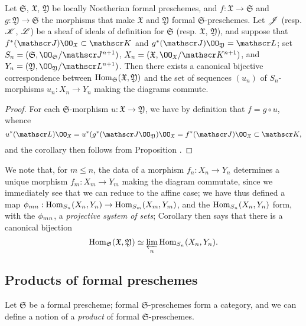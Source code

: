 \begin{cor}[10.6.11]
\label{1.10.6.11}
Let $\mathfrak{S}$, $\mathfrak{X}$, $\mathfrak{Y}$ be locally Noetherian formal preschemes, and $f:\mathfrak{X}\to\mathfrak{S}$ and $g:\mathfrak{Y}\to\mathfrak{S}$ the morphisms that make $\mathfrak{X}$ and $\mathfrak{Y}$ formal $\mathfrak{S}$-preschemes.
Let $\mathscr{J}$ (resp. $\mathscr{K}$, $\mathscr{L}$) be a sheaf of ideals of definition for $\mathfrak{S}$ (resp. $\mathfrak{X}$, $\mathfrak{Y}$), and suppose that $f^*(\sh{J})\OO_\mathfrak{X}\subset\sh{K}$ and $g^*(\sh{J})\OO_\mathfrak{Y}=\sh{L}$; set $S_n=(\mathfrak{S},\OO_\mathfrak{S}/\sh{J}^{n+1})$, $X_n=(\mathfrak{X},\OO_\mathfrak{X}/\sh{K}^{n+1})$, and $Y_n=(\mathfrak{Y},\OO_\mathfrak{Y}/\sh{L}^{n+1})$.
Then there exists a canonical bijective correspondence
between $\operatorname{Hom}_\mathfrak{S}(\mathfrak{X},\mathfrak{Y})$ and the set of sequences $(u_n)$ of $S_n$-morphisms $u_n:X_n\to Y_n$ making the diagrams  commute.
\end{cor}

\begin{proof}
\label{proof-1.10.6.11}
For each $\mathfrak{S}$-morphism $u:\mathfrak{X}\to\mathfrak{Y}$, we have by definition that $f=g\circ u$, whence
\[
  u^*(\sh{L})\OO_\mathfrak{X}=u^*(g^*(\sh{J}\OO_\mathfrak{Y})\OO_\mathfrak{X}=f^*(\sh{J})\OO_\mathfrak{X}\subset\sh{K},
\]
and the corollary then follows from Proposition .
\end{proof}

We note that, for $m\leq n$, the data of a morphism $f_n:X_n\to Y_n$ determines a unique morphism $f_m:X_m\to Y_m$ making the diagram  commutate, since we immediately see that we can reduce to the affine case; we have thus defined a map $\vphi_{mn}:\Hom_{S_n}(X_n,Y_n)\to\Hom_{S_m}(X_m,Y_m)$, and the $\operatorname{Hom}_{S_n}(X_n,Y_n)$ form, with the $\phi_{mn}$, a \emph{projective system of sets}; Corollary  then says that there is a canonical bijection
\[
  \operatorname{Hom}_\mathfrak{S}(\mathfrak{X},\mathfrak{Y})\simeq\varprojlim_n\operatorname{Hom}_{S_n}(X_n,Y_n).
\]

\subsection{Products of formal preschemes}
\label{subsection:1.10.7}

\begin{env}[10.7.1]
\label{1.10.7.1}
Let $\mathfrak{S}$ be a formal prescheme; formal $\mathfrak{S}$-preschemes form a category, and we can define a notion of a \emph{product} of formal $\mathfrak{S}$-preschemes.
\end{env}

